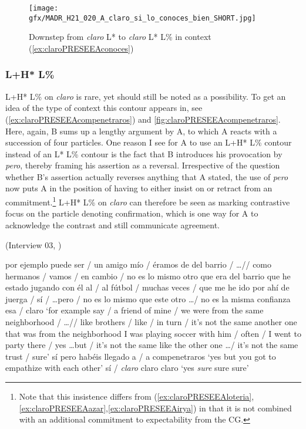 \begin{figure}
	\texttt{[image: gfx/MADR\_H21\_020\_A\_claro\_si\_lo\_conoces\_bien\_SHORT.jpg]}
	\caption{Downstep from \textit{claro} L* to \textit{claro} L* L\% in context (\ref{ex:claroPRESEEAconoces}) \href{https://osf.io/38q4m/}{\faVolumeUp} \label{fig:claroPRESEEAconoces}}
\end{figure}

\subsubsection{L+H* L\%}

L+H* L\% on \textit{claro} is rare, yet should still be noted as a possibility. To get an idea of the type of context this contour appears in, see (\ref{ex:claroPRESEEAcompenetraros}) and \autoref{fig:claroPRESEEAcompenetraros}. Here, again, B sums up a lengthy argument by A, to which A reacts with a succession of four particles. One reason I see for A to use an L+H* L\% contour instead of an L* L\% contour is the fact that B introduces his provocation by \textit{pero}, thereby framing his assertion as a reversal. Irrespective of the question whether B's assertion actually reverses anything that A stated, the use of \textit{pero} now puts A in the position of having to either insist on or retract from an commitment.\footnote{Note that this insistence differs from (\ref{ex:claroPRESEEAloteria},\ref{ex:claroPRESEEAazar},\ref{ex:claroPRESEEAirya}) in that it is not combined with an additional commitment to expectability from the \ac{CG}.} L+H* L\% on \textit{claro} can therefore be seen as marking contrastive focus on the particle denoting confirmation, which is one way for A to acknowledge the contrast and still communicate agreement.

\begin{exe}
	\ex (Interview 03, \cite{PRESEEA.20142020})  \label{ex:claroPRESEEAcompenetraros}
	\begin{xlist}[A:]
	 por ejemplo puede ser / un amigo mío / éramos de del barrio / \ldots // como hermanos / vamos / en cambio / no es lo mismo otro que era del barrio que he estado jugando con él al / al fútbol / muchas veces / que me he ido por ahí de juerga / sí / \ldots pero / no es lo mismo que este otro \ldots / no es la misma confianza esa / claro 
	\glt `for example say / a friend of mine / we were from the same neighborhood / \ldots // like brothers / like / in turn / it's not the same another one that was from the neighborhood I was playing soccer with him / often / I went to party there / yes \ldots but / it's not the same like the other one \ldots / it's not the same trust / sure' 
	 sí pero habéis llegado a / a compenetraros
	\glt `yes but you got to empathize with each other'
	 sí / \textit{claro} claro claro
	\glt `yes \textit{sure} sure sure' 
	\end{xlist}
\end{exe}

